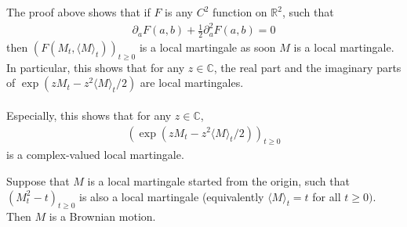 \documentclass[../mainfile.tex]{subfiles}
\begin{document}
\begin{rem} The proof above shows that if $F$ is any $C^2$ function on $\mathbb{R}^2$, such that 
\begin{align*}
\partial_a F(a,b) + \frac{1}{2} \partial_a^2 F(a,b)=0
\end{align*}
then $( F(M_t, \langle M \rangle_t))_{t \geq 0}$ is a local martingale as soon $M$ is a local martingale. In particular, this shows that for any $z \in \mathbb{C}$, the real part and the imaginary parts of $\exp(z M_t-z^2 \langle M \rangle_t/2)$ are local martingales.
\\\\
Especially, this shows that for any $z \in \mathbb{C}$, 
\begin{align*}
 ( \exp(z M_t-z^2 \langle M \rangle_t /2))_{t \geq 0}
\end{align*}
is a complex-valued local martingale. 
\end{rem}
\newpage
\begin{cor} Suppose that $M$ is a local martingale started from the origin, such that $(M_t^2-t)_{t \geq 0}$ is also a local martingale (equivalently $\langle M \rangle_t=t$ for all $t \geq 0)$. Then $M$ is a Brownian motion. 
\end{cor}
\end{document}

